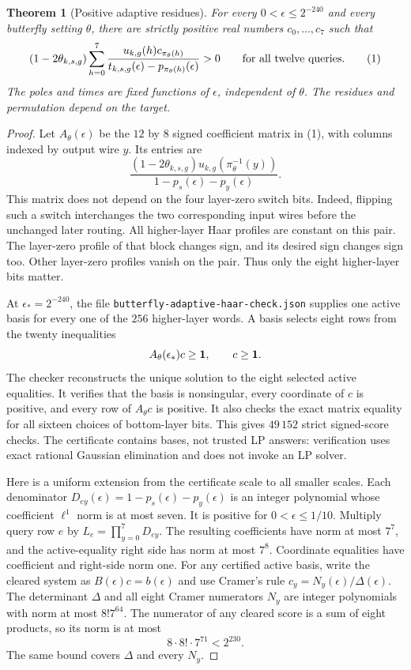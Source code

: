 \documentclass[11pt]{article}
\newtheorem{theorem}{Theorem}
\begin{document}
\begin{theorem}[Positive adaptive residues]
For every $0<\epsilon\leq2^{-240}$ and every butterfly setting $\theta$,
there are strictly positive real numbers $c_0,\ldots,c_7$ such that
\[
 (1-2\theta_{k,s,g})\sum_{h=0}^7
 \frac{u_{k,g}(h)c_{\pi_\theta(h)}}
 {t_{k,s,g}(\epsilon)-p_{\pi_\theta(h)}(\epsilon)}>0
 \qquad\hbox{for all twelve queries.}                 \tag{1}
\]
The poles and times are fixed functions of $\epsilon$, independent of
$\theta$. The residues and permutation depend on the target.
\end{theorem}
\begin{proof}
Let $A_\theta(\epsilon)$ be the $12$ by $8$ signed coefficient matrix
in (1), with columns indexed by output wire $y$. Its entries are
\[
 \frac{(1-2\theta_{k,s,g})u_{k,g}(\pi_\theta^{-1}(y))}
 {1-p_s(\epsilon)-p_y(\epsilon)}.                    \tag{2}
\]
This matrix does not depend on the four layer-zero switch bits. Indeed,
flipping such a switch interchanges the two corresponding input wires
before the unchanged later routing. All higher-layer Haar profiles are
constant on this pair. The layer-zero profile of that block changes sign,
and its desired sign changes sign too. Other layer-zero profiles vanish
on the pair. Thus only the eight higher-layer bits matter.

At $\epsilon_*=2^{-240}$, the file
\texttt{butterfly-adaptive-haar-check.json} supplies one active basis for
every one of the $256$ higher-layer words. A basis selects eight rows
from the twenty inequalities
\[
 A_\theta(\epsilon_*)c\geq {\bf1},\qquad c\geq {\bf1}.
\]
The checker reconstructs the unique solution to the eight selected
active equalities. It verifies that the basis is nonsingular, every
coordinate of $c$ is positive, and every row of $A_\theta c$ is positive.
It also checks the exact matrix equality for all sixteen choices of
bottom-layer bits. This gives $49\,152$ strict signed-score checks.
The certificate contains bases, not trusted LP answers: verification
uses exact rational Gaussian elimination and does not invoke an LP solver.

Here is a uniform extension from the certificate scale to all smaller
scales. Each denominator
$D_{ey}(\epsilon)=1-p_s(\epsilon)-p_y(\epsilon)$ is an integer
polynomial whose coefficient $\ell^1$ norm is at most seven. It is
positive for $0<\epsilon\leq1/10$. Multiply query row $e$ by
$L_e=\prod_{y=0}^7D_{ey}$. The resulting coefficients have norm at most
$7^7$, and the active-equality right side has norm at most $7^8$.
Coordinate equalities have coefficient and right-side norm one.
For any certified active basis, write the cleared system as
$B(\epsilon)c=b(\epsilon)$ and use Cramer's rule
$c_y=N_y(\epsilon)/\Delta(\epsilon)$.
The determinant $\Delta$ and all eight Cramer numerators $N_y$ are
integer polynomials with norm at most $8!7^{64}$. The numerator of any
cleared score is a sum of eight products, so its norm is at most
\[
 8\cdot8!\cdot7^{71}<2^{230}.                       \tag{3}
\]
The same bound covers $\Delta$ and every $N_y$.


\end{proof}
\end{document}
